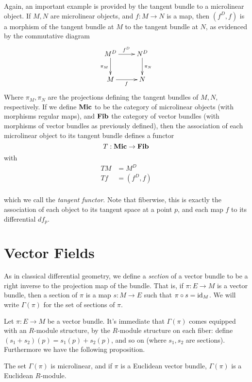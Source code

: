 Again, an important example is provided by the tangent bundle to a microlinear object. If \( M,N \) are microlinear objects, and \( f:M\to N \) is a map, then \( (f^D,f) \) is a morphism of the tangent bundle at \( M \) to the tangent bundle at \( N \), as evidenced by the commutative diagram
\begin{equation*}
  \xymatrix{
    M^D \ar[d]_{\pi_M} \ar[r]^{f^D} & N^D \ar[d]^{\pi_N} \\
    M                  \ar[r]_f     & N
  }
\end{equation*}
Where \( \pi_M,\pi_N \) are the projections defining the tangent bundles of \( M,N \), respectively. If we define \( \mathbf{Mic} \) to be the category of microlinear objects (with morphisms regular maps), and \( \mathbf{Fib} \) the category of vector bundles (with morphisms of vector bundles as previously defined), then the association of each microlinear object to its tangent bundle defines a functor
\begin{equation*}
  T:\mathbf{Mic}\to\mathbf{Fib}
\end{equation*}
with
\begin{align*}
  TM &= M^D     \\
  Tf &= (f^D,f) \\
\end{align*}

which we call the \emph{tangent functor}. Note that fiberwise, this is exactly the association of each object to its tangent space at a point \( p \), and each map \( f \) to its differential \( df_p \).

\section{Vector Fields}

As in classical differential geometry, we define a \emph{section} of a vector bundle to be a right inverse to the projection map of the bundle. That is, if \( \pi:E\to M \) is a vector bundle, then a section of \( \pi \) is a map \( s:M\to E \) such that \( \pi\circ s = \operatorname{id}_M \). We will write \( \Gamma(\pi) \) for the set of sections of \( \pi \).

Let \( \pi:E\to M \) be a vector bundle. It's immediate that \( \Gamma(\pi) \) comes equipped with an \( R \)-module structure, by the \( R \)-module structure on each fiber: define \( (s_1+s_2)(p) = s_1(p)+s_2(p) \), and so on (where \( s_1,s_2 \) are sections). Furthermore we have the following proposition.

\begin{proposition}
  The set \( \Gamma(\pi) \) is microlinear, and if \( \pi \) is a Euclidean vector bundle, \( \Gamma(\pi) \) is a Euclidean \( R \)-module.
\end{proposition}

